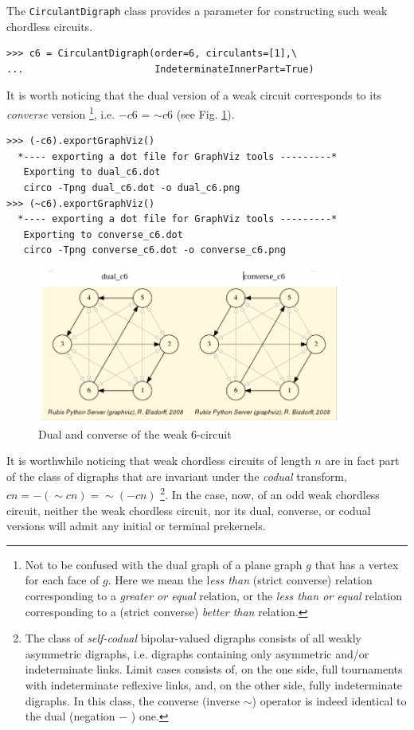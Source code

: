The \texttt{CirculantDigraph} class provides a parameter for constructing such weak chordless circuits. 
\begin{lstlisting}
>>> c6 = CirculantDigraph(order=6, circulants=[1],\
...                       IndeterminateInnerPart=True)
\end{lstlisting}
It is worth noticing that the dual version of a weak circuit corresponds to its \emph{converse} version \footnote{Not to be confused with the dual graph of a plane graph $g$ that has a vertex for each face of $g$. Here we mean the l\emph{ess than} (strict converse) relation corresponding to a \emph{greater or equal} relation, or the \emph{less than or equal} relation corresponding to a (strict converse) \emph{better than} relation.}, i.e. $-c6$ = $\sim c6$ (see Fig. \ref{fig:17.4}).
\begin{lstlisting}
>>> (-c6).exportGraphViz()
  *---- exporting a dot file for GraphViz tools ---------*
   Exporting to dual_c6.dot
   circo -Tpng dual_c6.dot -o dual_c6.png
>>> (~c6).exportGraphViz()
  *---- exporting a dot file for GraphViz tools ---------*
   Exporting to converse_c6.dot
   circo -Tpng converse_c6.dot -o converse_c6.png 
\end{lstlisting}
\begin{figure}[h]
\includegraphics[width=10cm]{Figures/weakChordlessCircuit.png}
\caption{Dual and converse of the weak 6-circuit}
\label{fig:17.4}       %
\end{figure}

It is worthwhile noticing that weak chordless circuits of length $n$ are in fact part of the class of digraphs that are invariant under the \emph{codual} transform, $cn = - (\sim cn) = \sim (-cn )$ \footnote{The class of \emph{self-codual} bipolar-valued digraphs consists of all weakly asymmetric digraphs, i.e. digraphs containing only asymmetric and/or indeterminate links. Limit cases consists of, on the one side, full tournaments with indeterminate reflexive links, and, on the other side, fully indeterminate digraphs. In this class, the converse (inverse $\sim$) operator is indeed identical to the dual (negation $-$ ) one.}. In the case, now, of an odd weak chordless circuit, neither the weak chordless circuit, nor its dual, converse, or codual versions will admit any initial or terminal prekernels. 

